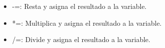 \begin{itemize}
    \item -=: Resta y asigna el resultado a la variable.
    \begin{figure}[h]
      \centering
    \end{figure}
\newpage
    \item *=: Multiplica y asigna el resultado a la variable.
    \begin{figure}[h]
      \centering
    \end{figure}
    
    \item /=: Divide y asigna el resultado a la variable.
    \begin{figure}[h]
      \centering
    \end{figure}
\end{itemize}

